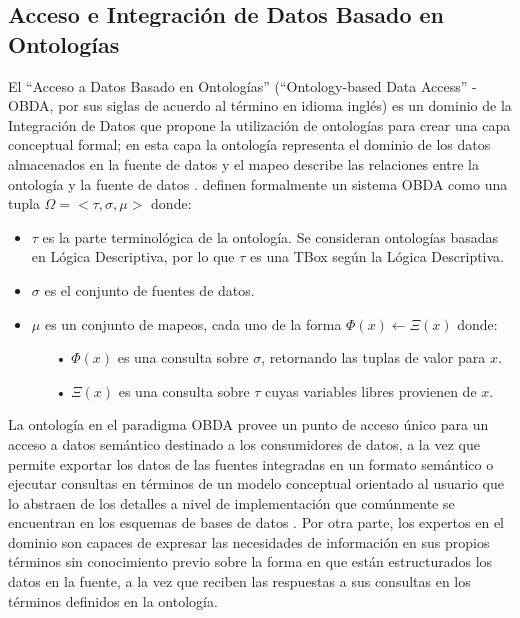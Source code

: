 \subsection{Acceso e Integración de Datos Basado en Ontologías}\label{Acceso e Integración de Datos Basado en Ontologías}
El ``Acceso a Datos Basado en Ontologías'' (``Ontology-based Data Access'' - OBDA, por sus siglas de acuerdo al término en idioma inglés) es un dominio de la Integración de Datos que propone la utilización de ontologías para crear una capa conceptual formal; en esta capa la ontología representa el dominio de los datos almacenados en la fuente de datos y el mapeo describe las relaciones entre la ontología y la fuente de datos \citep{Calvanese:2015:SOY:2991147.2991152,KHARLAMOV20173}. \cite{Tabares-Martin2016} definen formalmente un sistema OBDA como una tupla \( \Omega = <\tau,\sigma,\mu> \) donde:

\begin{itemize}
 	\item \(\tau\) es la parte terminológica de la ontología. Se consideran ontologías basadas en Lógica Descriptiva, por lo que $\tau$ es una TBox según la Lógica Descriptiva.
 	\item $\sigma$ es el conjunto de fuentes de datos.
 	\item $\mu$ es un conjunto de mapeos, cada uno de la forma $\Phi(x) \leftarrow \Xi(x)$ donde:
 	\begin{itemize}
 		\item[•] $\Phi(x)$ es una consulta sobre $\sigma$, retornando las tuplas de valor para $x$.
 		\item[•] $\Xi(x)$ es una consulta sobre $\tau$ cuyas variables libres provienen de $x$.
 	\end{itemize}
\end{itemize}

La ontología en el paradigma OBDA provee un punto de acceso único para un acceso a datos semántico destinado a los consumidores de datos, a la vez que permite exportar los datos de las fuentes integradas en un formato semántico o ejecutar consultas en términos de un modelo conceptual orientado al usuario que lo abstraen de los detalles a nivel de implementación que comúnmente se encuentran en los esquemas de bases de datos \citep{KHARLAMOV20173}. Por otra parte, los expertos en el dominio son capaces de expresar las necesidades de información en sus propios términos sin conocimiento previo sobre la forma en que están estructurados los datos en la fuente, a la vez que reciben las respuestas a sus consultas en los términos definidos en la ontología.

